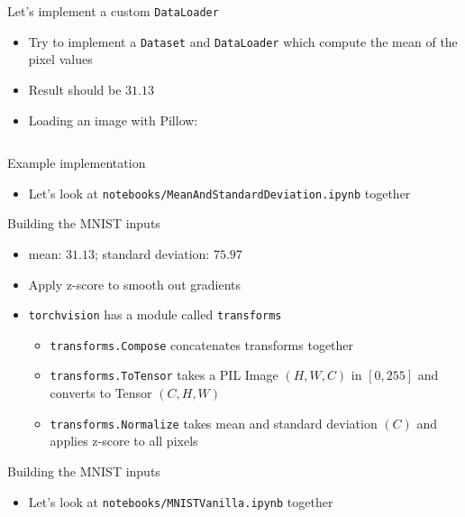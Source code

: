\documentclass[hyperref={pdfpagelabels=false},12pt]{beamer}
\newcommand{\code}[2]{\texttt{#2}}
\newcommand{\python}[1]{\code{python}{#1}}
\newcommand{\pygment}[3]{\inputminted[bgcolor=lightgray,linenos,fontsize=#1]{#2}{#3}}
\begin{document}
\begin{frame}{Let's implement a custom \python{DataLoader}}
  \begin{itemize}
    \item Try to implement a \python{Dataset} and \python{DataLoader} which
      compute the mean of the pixel values
    \item Result should be $31.13$
    \item Loading an image with Pillow:
  \end{itemize}
  \pygment{\scriptsize}{python}{code/pil-open.py}
\end{frame}

\begin{frame}{Example implementation}
  \begin{itemize}
    \item Let's look at \texttt{notebooks/MeanAndStandardDeviation.ipynb} together
  \end{itemize}
\end{frame}

\begin{frame}{Building the MNIST inputs}
  \begin{itemize}
    \item mean: $31.13$; standard deviation: $75.97$
    \item Apply z-score to smooth out gradients
    \item \texttt{torchvision} has a module called \texttt{transforms}
    \begin{itemize}
      \item \python{transforms.Compose} concatenates transforms together
      \item \python{transforms.ToTensor} takes a PIL Image $(H, W, C)$
        in $[0, 255]$ and converts to Tensor $(C, H, W)$
      \item \python{transforms.Normalize} takes mean and standard deviation
        $(C)$ and applies z-score to all pixels
    \end{itemize}
  \end{itemize}
\end{frame}

\begin{frame}{Building the MNIST inputs}
  \begin{itemize}
    \item Let's look at \texttt{notebooks/MNISTVanilla.ipynb} together
  \end{itemize}
\end{frame}
\end{document}
